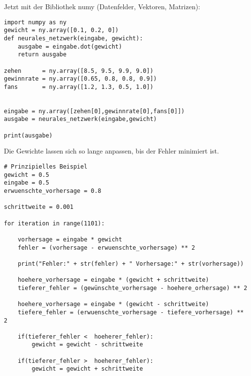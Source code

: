 \documentclass[12pt]{article}
\begin{document}
Jetzt mit der Bibliothek numy (Datenfelder, Vektoren, Matrizen):

\begin{verbatim}
import numpy as ny
gewicht = ny.array([0.1, 0.2, 0])
def neurales_netzwerk(eingabe, gewicht):
    ausgabe = eingabe.dot(gewicht)
    return ausgabe
    
zehen      = ny.array([8.5, 9.5, 9.9, 9.0])
gewinnrate = ny.array([0.65, 0.8, 0.8, 0.9])
fans       = ny.array([1.2, 1.3, 0.5, 1.0])


eingabe = ny.array([zehen[0],gewinnrate[0],fans[0]])
ausgabe = neurales_netzwerk(eingabe,gewicht)

print(ausgabe)
\end{verbatim}

Die Gewichte lassen sich so lange anpassen, 
bis der Fehler minimiert ist.

\begin{verbatim}
# Prinzipielles Beispiel
gewicht = 0.5
eingabe = 0.5
erwuenschte_vorhersage = 0.8

schrittweite = 0.001

for iteration in range(1101):

    vorhersage = eingabe * gewicht
    fehler = (vorhersage - erwuenschte_vorhersage) ** 2

    print("Fehler:" + str(fehler) + " Vorhersage:" + str(vorhersage))
    
    hoehere_vorhersage = eingabe * (gewicht + schrittweite)
    tieferer_fehler = (gewünschte_vorhersage - hoehere_orhersage) ** 2

    hoehere_vorhersage = eingabe * (gewicht - schrittweite)
    tiefere_fehler = (erwuenschte_vorhersage - tiefere_vorhersage) ** 2

    if(tieferer_fehler <  hoeherer_fehler):
        gewicht = gewicht - schrittweite
        
    if(tieferer_fehler >  hoeherer_fehler):
        gewicht = gewicht + schrittweite
\end{verbatim}
\end{document}
